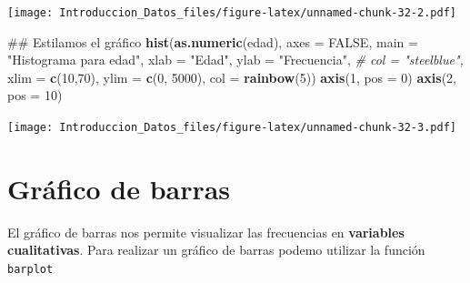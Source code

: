 \documentclass[spanish,]{book}
\newenvironment{Shaded}{\begin{snugshade}}{\end{snugshade}}
\newcommand{\KeywordTok}[1]{\textcolor[rgb]{0.13,0.29,0.53}{\textbf{#1}}}
\newcommand{\DataTypeTok}[1]{\textcolor[rgb]{0.13,0.29,0.53}{#1}}
\newcommand{\DecValTok}[1]{\textcolor[rgb]{0.00,0.00,0.81}{#1}}
\newcommand{\StringTok}[1]{\textcolor[rgb]{0.31,0.60,0.02}{#1}}
\newcommand{\CommentTok}[1]{\textcolor[rgb]{0.56,0.35,0.01}{\textit{#1}}}
\newcommand{\OtherTok}[1]{\textcolor[rgb]{0.56,0.35,0.01}{#1}}
\newcommand{\OperatorTok}[1]{\textcolor[rgb]{0.81,0.36,0.00}{\textbf{#1}}}
\newcommand{\NormalTok}[1]{#1}
\begin{document}
\texttt{[image: Introduccion\_Datos\_files/figure-latex/unnamed-chunk-32-2.pdf]}

\begin{Shaded}
\begin{Highlighting}[]
\NormalTok{## Estilamos el gráfico}
\KeywordTok{hist}\NormalTok{(}\KeywordTok{as.numeric}\NormalTok{(edad),}
     \DataTypeTok{axes =} \OtherTok{FALSE}\NormalTok{,}
     \DataTypeTok{main =} \StringTok{"Histograma para edad"}\NormalTok{,}
     \DataTypeTok{xlab =} \StringTok{"Edad"}\NormalTok{,}
     \DataTypeTok{ylab =} \StringTok{"Frecuencia"}\NormalTok{,}
     \CommentTok{# col = "steelblue",}
     \DataTypeTok{xlim =} \KeywordTok{c}\NormalTok{(}\DecValTok{10}\NormalTok{,}\DecValTok{70}\NormalTok{),}
     \DataTypeTok{ylim =} \KeywordTok{c}\NormalTok{(}\DecValTok{0}\NormalTok{, }\DecValTok{5000}\NormalTok{),}
     \DataTypeTok{col =} \KeywordTok{rainbow}\NormalTok{(}\DecValTok{5}\NormalTok{))}
\KeywordTok{axis}\NormalTok{(}\DecValTok{1}\NormalTok{, }\DataTypeTok{pos =} \DecValTok{0}\NormalTok{)}
\KeywordTok{axis}\NormalTok{(}\DecValTok{2}\NormalTok{, }\DataTypeTok{pos =} \DecValTok{10}\NormalTok{)}
\end{Highlighting}
\end{Shaded}

\texttt{[image: Introduccion\_Datos\_files/figure-latex/unnamed-chunk-32-3.pdf]}

\section{Gráfico de barras}\label{grafico-de-barras}

El gráfico de barras nos permite visualizar las frecuencias en
\textbf{variables cualitativas}. Para realizar un gráfico de barras
podemo utilizar la función \texttt{barplot}

\begin{Shaded}
\end{Shaded}
\end{document}
